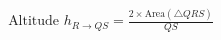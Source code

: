 \documentclass[preview]{standalone}
\begin{document}
\begin{align*}
\text{Altitude } h_{R \to QS} = \frac{2 \times \text{Area}(\triangle QRS)}{QS}
\end{align*}
\end{document}
